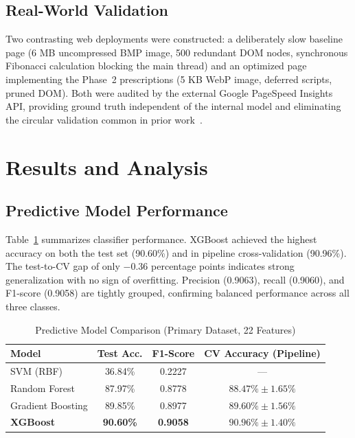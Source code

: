 \documentclass{svproc}
\begin{document}
\subsection{Real-World Validation}

Two contrasting web deployments were constructed: a deliberately slow baseline page (6 MB uncompressed BMP image, 500 redundant DOM nodes, synchronous Fibonacci calculation blocking the main thread) and an optimized page implementing the Phase~2 prescriptions (5 KB WebP image, deferred scripts, pruned DOM). Both were audited by the external Google PageSpeed Insights API, providing ground truth independent of the internal model and eliminating the circular validation common in prior work~\cite{vanriet2023}.

\section{Results and Analysis}

\subsection{Predictive Model Performance}

Table~\ref{tab:model_comparison} summarizes classifier performance. XGBoost achieved the highest accuracy on both the test set (90.60\%) and in pipeline cross-validation (90.96\%). The test-to-CV gap of only $-0.36$ percentage points indicates strong generalization with no sign of overfitting. Precision (0.9063), recall (0.9060), and F1-score (0.9058) are tightly grouped, confirming balanced performance across all three classes.

\begin{table}[h]
\caption{Predictive Model Comparison (Primary Dataset, 22 Features)}\label{tab:model_comparison}
\centering
\begin{tabular}{lccc}
\toprule
Model & Test Acc. & F1-Score & CV Accuracy (Pipeline) \\
\midrule
SVM (RBF) & 36.84\% & 0.2227 & --- \\
Random Forest & 87.97\% & 0.8778 & $88.47\% \pm 1.65\%$ \\
Gradient Boosting & 89.85\% & 0.8977 & $89.60\% \pm 1.56\%$ \\
\textbf{XGBoost} & \textbf{90.60\%} & \textbf{0.9058} & $\mathbf{90.96\% \pm 1.40\%}$ \\
\bottomrule
\end{tabular}
\end{table}
\end{document}

